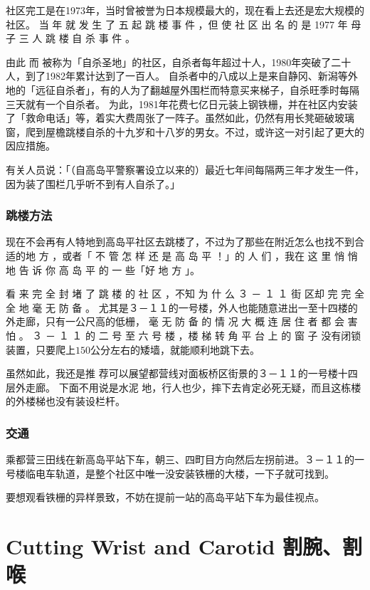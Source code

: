 \documentclass[UTF8]{ctexart}
\begin{document}
社区完工是在1973年，当时曾被誉为日本规模最大的，现在看上去还是宏大规模的社区。 
当 年 就 发 生 了 五 起 跳 楼 事 件 ，但 使 社 区 出 名 的 是 1977 年 母 子 三 人 跳 楼 自 杀 事 件 。

由此 而 被称为「自杀圣地」的社区，自杀者每年超过十人，1980年突破了二十人，到了1982年累计达到了一百人。 
自杀者中的八成以上是来自静冈、新潟等外地的「远征自杀者」，有的人为了翻越屋外围栏而特意买来梯子，自杀旺季时每隔三天就有一个自杀者。
为此，1981年花费七亿日元装上钢铁栅，并在社区内安装了「救命电话」等，着实大费周张了一阵子。虽然如此，仍然有用长凳砸破玻璃窗，爬到屋檐跳楼自杀的十九岁和十八岁的男女。不过，或许这一对引起了更大的因应措施。

有关人员说：「（自高岛平警察署设立以来的）最近七年间每隔两三年才发生一件，因为装了围栏几乎听不到有人自杀了。」

\subsubsection{跳楼方法}

现在不会再有人特地到高岛平社区去跳楼了，不过为了那些在附近怎么也找不到合适的地
方 ，或者「 不 管 怎 样 还 是 高 岛 平 ！」的 人 们 ，我在 这 里 悄 悄 地 告 诉 你 高 岛 平 的 一 些「好 地 方 」。

看 来 完 全 封 堵 了 跳 楼 的 社 区 ，不知 为 什 么 ３ － １ １ 街 区却 完 完 全 全 地 毫 无 防 备 。 
尤其是３－１１的一号楼，外人也能随意进出一至十四楼的外走廊，只有一公尺高的低栅， 毫 无 防 备 的 情 况 大 概 连 居 住 者 都 会 害 怕 。
３ － １ １ 的 二 号  至  六 号 楼 ，楼 梯 转 角 平 台 上 的 窗 子 没有闭锁装置，只要爬上$150$公分左右的矮墙，就能顺利地跳下去。

虽然如此，我还是推 荐可以展望都营线对面板桥区街景的３－１１的一号楼十四层外走廊。
下面不用说是水泥 地，行人也少，摔下去肯定必死无疑，而且这栋楼的外楼梯也没有装设栏杆。

\subsubsection{交通}

乘都营三田线在新高岛平站下车，朝三、四町目方向然后左拐前进。３－１１的一号楼临电车轨道，是整个社区中唯一没安装铁栅的大楼，一下子就可找到。

要想观看铁栅的异样景致，不妨在提前一站的高岛平站下车为最佳视点。

\section{Cutting Wrist and Carotid 割腕、割喉}
\end{document}
